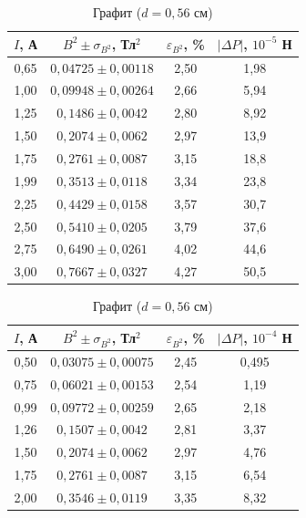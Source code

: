 \documentclass[a4paper]{article}
\begin{document}
\begin{enumerate}
\begin{table}[h!]
    \centering
    \begin{minipage}{0.48\textwidth}
        \centering
        \begin{tabular}{|c|c|c|c|}
            \hline
            $I$, А & $B^2 \pm \sigma_{B^2}$, Тл$^2$ & $\varepsilon_{B^2}$, \% & $|\Delta P|$, $10^{-5}$ Н \\ \hline
        0,65 & $0,04725 \pm 0,00118$ & 2,50 & 1,98 \\ \hline
        1,00 & $0,09948 \pm 0,00264$ & 2,66 & 5,94 \\ \hline
        1,25 & $0,1486 \pm 0,0042$ & 2,80 & 8,92 \\ \hline
        1,50 & $0,2074 \pm 0,0062$ & 2,97 & 13,9 \\ \hline
        1,75 & $0,2761 \pm 0,0087$ & 3,15 & 18,8 \\ \hline
        1,99 & $0,3513 \pm 0,0118$ & 3,34 & 23,8 \\ \hline
        2,25 & $0,4429 \pm 0,0158$ & 3,57 & 30,7 \\ \hline
        2,50 & $0,5410 \pm 0,0205$ & 3,79 & 37,6 \\ \hline
        2,75 & $0,6490 \pm 0,0261$ & 4,02 & 44,6 \\ \hline
        3,00 & $0,7667 \pm 0,0327$ & 4,27 & 50,5 \\ \hline
        \end{tabular}
        \caption{Графит ($d = 0,56$ см)}
        \label{tab:graphite}
    \end{minipage}
    \hfill
    \begin{minipage}{0.48\textwidth}
        \centering
        \begin{tabular}{|c|c|c|c|}
            \hline
            $I$, А & $B^2 \pm \sigma_{B^2}$, Тл$^2$ & $\varepsilon_{B^2}$, \% & $|\Delta P|$, $10^{-4}$ Н \\ \hline
        0,50 & $0,03075 \pm 0,00075$ & 2,45 & 0,495 \\ \hline
        0,75 & $0,06021 \pm 0,00153$ & 2,54 & 1,19 \\ \hline
        0,99 & $0,09772 \pm 0,00259$ & 2,65 & 2,18 \\ \hline
        1,26 & $0,1507 \pm 0,0042$ & 2,81 & 3,37 \\ \hline
        1,50 & $0,2074 \pm 0,0062$ & 2,97 & 4,76 \\ \hline
        1,75 & $0,2761 \pm 0,0087$ & 3,15 & 6,54 \\ \hline
        2,00 & $0,3546 \pm 0,0119$ & 3,35 & 8,32 \\ \hline

\end{tabular}
\end{minipage}
\end{table}
\end{enumerate}
\end{document}
